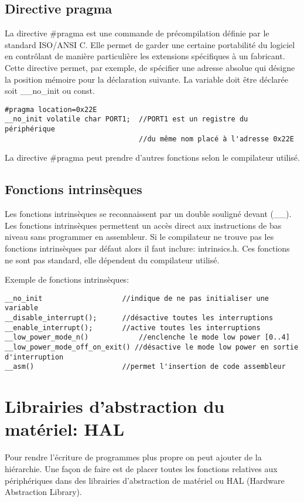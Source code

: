 \subsection{Directive pragma}
La directive \#pragma est une commande de précompilation définie par le standard ISO/ANSI C. Elle permet de garder une certaine portabilité du logiciel en contrôlant de manière particulière les extensions spécifiques à un fabricant. Cette directive permet, par exemple, de spécifier une adresse absolue qui désigne la position mémoire pour la déclaration suivante. La variable doit être déclarée soit \_\_no\_init ou const. 

\lstset{style=customc}
\begin{lstlisting}
#pragma location=0x22E
__no_init volatile char PORT1;	//PORT1 est un registre du périphérique
                                //du même nom placé à l'adresse 0x22E
\end{lstlisting}
La directive \#pragma peut prendre d'autres fonctions selon le compilateur utilisé.

\subsection{Fonctions intrinsèques}
Les fonctions intrinsèques se reconnaissent par un double souligné devant (\_\_). Les fonctions intrinsèques permettent un accès direct aux instructions de bas niveau sans programmer en assembleur. Si le compilateur ne trouve pas les fonctions intrinsèques par défaut alors il faut inclure: intrinsics.h. Ces fonctions ne sont pas standard, elle dépendent du compilateur utilisé.

Exemple de fonctions intrinsèques:
\lstset{style=customc}
\begin{lstlisting}
__no_init					//indique de ne pas initialiser une variable
__disable_interrupt();		//désactive toutes les interruptions
__enable_interrupt();		//active toutes les interruptions
__low_power_mode_n()			//enclenche le mode low power [0..4]
__low_power_mode_off_on_exit() //désactive le mode low power en sortie d'interruption
__asm()						//permet l'insertion de code assembleur
\end{lstlisting}


\section{Librairies d'abstraction du matériel: HAL}
Pour rendre l'écriture de programmes plus propre on peut ajouter de la hiérarchie. Une façon de faire est de placer toutes les fonctions relatives aux périphériques dans des librairies d'abstraction de matériel ou HAL (Hardware Abstraction Library).

